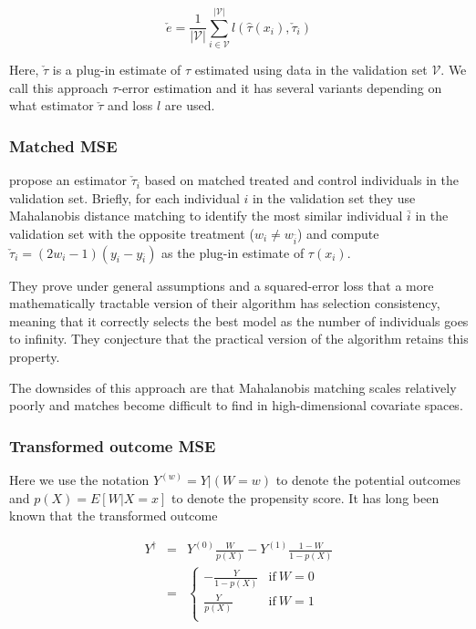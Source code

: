 \begin{equation}
\check e = \frac{1}{|\mathcal{V}|}\sum_{i \in \mathcal{V}}^{|\mathcal{V}|}  l(\hat \tau (x_i), \check \tau_i)
\label{te-error}
\end{equation}

Here, $\check \tau$ is a plug-in estimate of $\tau$ estimated using data in the validation set $\mathcal{V}$. We call this approach $\tau$-error estimation and it has several variants depending on what estimator $\check\tau$ and loss $l$ are used.

\subsubsection{Matched MSE}
\label{match-mse}

\citet{Rolling:2013kz} propose an estimator $\check \tau_i$ based on matched treated and control individuals in the validation set. Briefly, for each individual $i$ in the validation set they use Mahalanobis distance matching to identify the most similar individual $\bar{i}$ in the validation set with the opposite treatment ($w_i \ne w_{\bar i}$) and compute $\check \tau_i = (2w_i -1)(y_i - y_{\bar i})$ as the plug-in estimate of $\tau(x_i)$. 

They prove under general assumptions and a squared-error loss that a more mathematically tractable version of their algorithm has selection consistency, meaning that it correctly selects the best model as the number of individuals goes to infinity. They conjecture that the practical version of the algorithm retains this property.

The downsides of this approach are that Mahalanobis matching scales relatively poorly and matches become difficult to find in high-dimensional covariate spaces.

\subsubsection{Transformed outcome MSE}
\label{trans-mse}

Here we use the notation $Y^{(w)} = Y|(W=w)$ to denote the potential outcomes and $p(X) = E[W|X=x]$ to denote the propensity score. It has long been known that the transformed outcome 

\begin{equation}
	\begin{array}{rcl}
	Y^{\dagger}  & = & Y^{(0)} \frac{W}{p(X)} - Y^{(1)} \frac{1-W}{1-p(X)} \\
	& = &
	\begin{cases}
		-\frac{Y}{1-p(X)} & \text{if} \ W=0 \\
		\frac{Y}{p(X)} & \text{if} \ W=1\\
	\end{cases} \\
	\end{array}
\end{equation}

